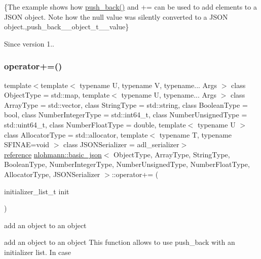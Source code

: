 \{The example shows how {\ttfamily \mbox{\hyperlink{classnlohmann_1_1basic__json_ac8e523ddc8c2dd7e5d2daf0d49a9c0d7}{push\+\_\+back()}}} and {\ttfamily +=} can be used to add elements to a J\+S\+ON object. Note how the {\ttfamily null} value was silently converted to a J\+S\+ON object.,push\+\_\+back\+\_\+\+\_\+object\+\_\+t\+\_\+\+\_\+value\}

\begin{DoxySince}{Since}
version 1.. 
\end{DoxySince}
\mbox{\label{classnlohmann_1_1basic__json_af245c2b6714d76ed99a2d02f2596d596}} 
\subsubsection{\texorpdfstring{operator+=()}{operator+=()}\hspace{0.1cm}{\footnotesize\ttfamily [4/4]}}
{\footnotesize\ttfamily template$<$template$<$ typename U, typename V, typename... Args $>$ class Object\+Type = std\+::map, template$<$ typename U, typename... Args $>$ class Array\+Type = std\+::vector, class String\+Type  = std\+::string, class Boolean\+Type  = bool, class Number\+Integer\+Type  = std\+::int64\+\_\+t, class Number\+Unsigned\+Type  = std\+::uint64\+\_\+t, class Number\+Float\+Type  = double, template$<$ typename U $>$ class Allocator\+Type = std\+::allocator, template$<$ typename T, typename S\+F\+I\+N\+A\+E=void $>$ class J\+S\+O\+N\+Serializer = adl\+\_\+serializer$>$ \\
\mbox{\hyperlink{classnlohmann_1_1basic__json_ac6a5eddd156c776ac75ff54cfe54a5bc}{reference}} \mbox{\hyperlink{classnlohmann_1_1basic__json}{nlohmann\+::basic\+\_\+json}}$<$ Object\+Type, Array\+Type, String\+Type, Boolean\+Type, Number\+Integer\+Type, Number\+Unsigned\+Type, Number\+Float\+Type, Allocator\+Type, J\+S\+O\+N\+Serializer $>$\+::operator+= (\begin{DoxyParamCaption}\item[{initializer\+\_\+list\+\_\+t}]{init }\end{DoxyParamCaption})\hspace{0.3cm}{\ttfamily [inline]}}



add an object to an object 

add an object to an object This function allows to use {\ttfamily push\+\_\+back} with an initializer list. In case


